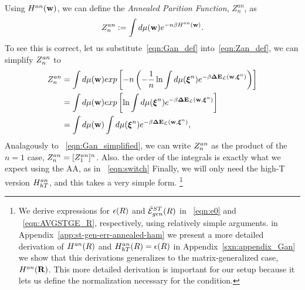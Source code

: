 {Using $H^{an}({\mathbf{w}})$, we can define the \emph{Annealed Parition Function}, $Z^{an}_{n}$, as
\begin{align}
  \label{eqn:Zan_def}
  Z^{an}_{n} :=  \int d\mu({\mathbf{w}}) e^{-n\beta H^{an}({\mathbf{w}})}.
\end{align}
To see this is correct, let us substitute~\ref{eqn:Gan_def} into~\ref{eqn:Zan_def}, we can simplify $Z^{an}_{n}$ to
\begin{align}
  \label{eqn:Zan_simple}
  Z^{an}_{n} &=  \int d\mu({\mathbf{w}}) exp\left[-n \left(- \frac{1}{n}\ln  \int d\mu(\boldsymbol{\xi}^{n})e^{-\beta\mathbf{\Delta {E}}_{\mathcal{L}}(\mathbf{w}, \boldsymbol{\xi}^{n})}\right)\right] \\ \nonumber
  &=  \int d\mu({\mathbf{w}}) exp\left[\ln  \int d\mu(\boldsymbol{\xi}^{n})e^{-\beta\mathbf{\Delta {E}}_{\mathcal{L}}(\mathbf{w}, \boldsymbol{\xi}^{n})}\right] \\ \nonumber
  &=  \int d\mu({\mathbf{w}})  \int d\mu(\boldsymbol{\xi}^{n})e^{-\beta\mathbf{\Delta {E}}_{\mathcal{L}}(\mathbf{w}, \boldsymbol{\xi}^{n})} ,
\end{align}
Analagously to \EQN~\ref{eqn:Gan_simplified}, we can write $Z^{an}_{n}$ as the product of the $n=1$ case, $Z^{an}_{n}=[Z^{an}_{1}]^{n}$.
Also. the order of the integrals is exactly what we expect using the AA, as in \EQN~\ref{eqn:switch}
Finally, we will only need the high-T version $H^{an}_{hT}$, and this takes a very simple form.
\footnote{We derive expressions for $\epsilon(R)$ and $\bar{\mathcal{E}}^{ST}_{gen}(R)$ in \EQN~\ref{eqn:e0} and \EQN~\ref{eqn:AVGSTGE_R}, respectively, using relatively simple arguments.
in Appendix~\ref{app:st-gen-err-annealed-ham} we present
a more detailed derivation of $H^{an}(R)$ and $H^{an}_{hT}(R)=\epsilon(R)$
in Appendix~\ref{sxn:appendix_Gan} we show that this derivations generalizes to the matrix-generalized case, $H^{an}(\mathbf{R})$.
This more detailed derivation is important for our \SETOL setup because it lets us define the normalization
necessary for the \TRACELOG condition.
}



}

